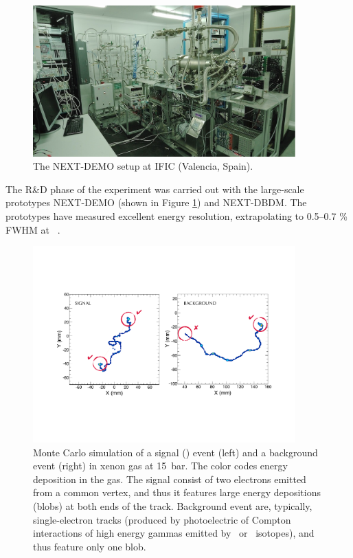 \begin{figure}
\centering
\includegraphics[width=0.9\textwidth]{img/DemoSetup.png}
\caption{\small The NEXT-DEMO setup at IFIC (Valencia, Spain).} \label{fig.DEMO}
\end{figure}

The R\&D phase of the experiment was carried out with the large-scale prototypes NEXT-DEMO (shown in Figure \ref{fig.DEMO}) and NEXT-DBDM. The prototypes have measured excellent energy resolution, extrapolating to 0.5--0.7 \% FWHM at \Qbb\  \cite{Alvarez:2012xda,Alvarez:2012kua,Lorca:2014sra}. 

\begin{figure}
\centering
\includegraphics[width= 0.9\textwidth]{img/TrackSignature.pdf}
\caption{Monte Carlo simulation of a signal (\bbonu) event (left) and a  background event (right) in xenon gas at 15~bar. The color codes energy deposition in the gas. The signal consist of two electrons emitted from a common vertex, and thus it features large energy depositions  (blobs) at both ends of the track. Background event are, typically, single-electron tracks (produced by photoelectric of Compton interactions of high energy gammas emitted by \BI\ or \TL\ isotopes), and thus feature only one blob.} \label{fig.ETRK2}
\end{figure}

